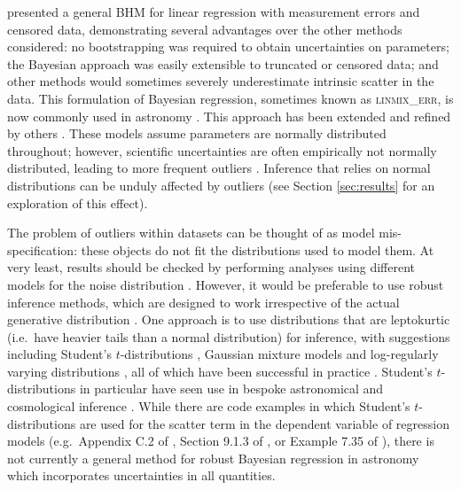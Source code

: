 \documentclass[fleqn,usenatbib]{rasti}
\begin{document}
\citet{Kelly:2007} presented a general BHM for linear regression with
measurement errors and censored data, demonstrating  several advantages over the
other methods considered: no bootstrapping was required to obtain uncertainties
on parameters; the Bayesian approach was easily extensible to truncated or
censored data; and other methods would sometimes severely underestimate
intrinsic scatter in the data. This formulation of Bayesian regression,
sometimes known as \textsc{linmix\_err}, is now commonly used in astronomy
\citep[e.g.][]{McConnell:2013, Bentz:2013, Andrews:2013}. This approach has been
extended and refined by others \citep[e.g.][]{Mantz:2016, Sereno:2016,
Bartlett:2023, Jing:2024}. These
models assume parameters are normally distributed throughout; however,
scientific uncertainties are often empirically not normally distributed, leading
to more frequent outliers \citep{Bailey:2017}. Inference that relies on normal
distributions can be unduly affected by outliers (see Section \ref{sec:results}
for an exploration of this effect).

The problem of outliers within datasets can be thought of as model
mis-specification: these objects do not fit the distributions used to model
them. At very least, results should be checked by performing analyses using
different models for the noise distribution \citep[e.g.][]{Andreon:2015,
McElreath:2020}. However, it would be preferable to use robust inference
methods, which are designed to work irrespective of the actual generative
distribution \citep{Berger:1994}. One approach is to use distributions that are
leptokurtic (i.e.\ have heavier tails than a normal distribution) for inference,
with suggestions including Student's $t$-distributions \citep{Andrews:1974},
Gaussian mixture models \citep{Box:1968, Aitkin:1980} and log-regularly varying
distributions \citep[LRVD;][]{Gagnon:2020, Hamura:2022}, all of which have been
successful in practice \citep[e.g.][]{Berger:1994, Sivia:2006, Gelman:2013,
Gagnon:2023, Hamura:2024}.  Student's $t$-distributions in particular have seen
use in bespoke astronomical and cosmological inference
\citep[e.g.][]{Andreon:2008, Jontof-Hutter:2016, Park:2017, Feeney:2018,
Andreon:2020}. While there are code examples in which Student's
$t$-distributions are used for the scatter term in the dependent variable of
regression models (e.g.\ Appendix C.2 of \citealt{Gelman:2013}, Section 9.1.3 of
\citealt{Andreon:2015}, or Example 7.35 of \citealt{McElreath:2020}), there is
not currently a general method for robust Bayesian regression in astronomy which
incorporates uncertainties in all quantities.
\end{document}
